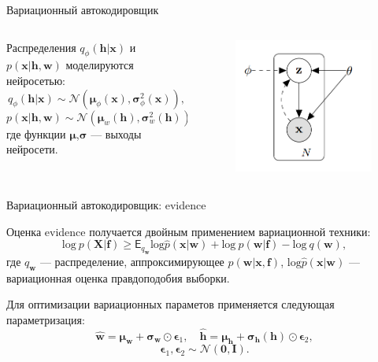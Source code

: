 \documentclass[10pt,pdf,utf8,russian,aspectratio=169]{beamer}
\begin{document}
\begin{frame}{Вариационный автокодировщик}
\begin{columns}[T]
\begin{column}{.65\textwidth}
Распределения $q_\phi(\mathbf{h}|\mathbf{x})$ и $p(\mathbf{x}|\mathbf{h}, \mathbf{w})$ моделируются нейросетью:
$$
q_\phi(\mathbf{h}|\mathbf{x}) \sim \mathcal{N}(\boldsymbol{\mu}_\phi(\mathbf{x}),\boldsymbol{\sigma}_\phi^2(\mathbf{x})), 
$$
$$
p(\mathbf{x}|\mathbf{h}, \mathbf{w}) \sim \mathcal{N}(\boldsymbol{\mu}_w(\mathbf{h}),\boldsymbol{\sigma}_w^2(\mathbf{h})),
$$
где функции $\boldsymbol{\mu}$,$\boldsymbol{\sigma}$ --- выходы нейросети.\\
\end{column}%
\hfill%
\begin{column}{.25\textwidth}
\begin{figure}
  \centering
\includegraphics[width=\textwidth]{graph.png}
\end{figure}
\end{column}
\end{columns}
\end{frame}

\begin{frame}{Вариационный автокодировщик: evidence}

Оценка evidence получается двойным применением вариационной техники:
$$
\text{log}~p(\mathbf{X}|\mathbf{f}) \geq \mathsf{E}_{q_\mathbf{w}} \text{log}\hat{p}(\mathbf{x}|\mathbf{w}) + \text{log}~p(\mathbf{w}|\mathbf{f}) - \text{log}~q(\mathbf{w}),
$$
где $q_\mathbf{w}$ --- распределение, аппроксимирующее $p(\mathbf{w}|\mathbf{x}, \mathbf{f})$, $ \text{log}\hat{p}(\mathbf{x}|\mathbf{w})$ --- вариационная оценка правдоподобия выборки.

Для оптимизации вариационных параметов применяется следующая параметризация:
$$
\hat{\mathbf{w}} = \boldsymbol{\mu}_\mathbf{w} + \boldsymbol{\sigma}_{\mathbf{w}}\odot \boldsymbol{\epsilon}_1,\quad \hat{\mathbf{h}} = \boldsymbol{\mu}_\mathbf{h} + \boldsymbol{\sigma}_\mathbf{h}(\mathbf{h})\odot \boldsymbol{\epsilon}_2, 
$$
$$
\boldsymbol{\epsilon}_1, \boldsymbol{\epsilon}_2 \sim \mathcal{N}(\mathbf{0}, \mathbf{I}).
$$

\end{frame}
\end{document}
